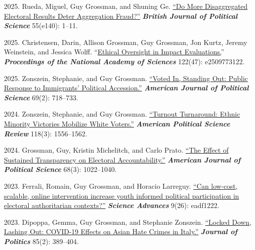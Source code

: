 \documentclass[10pt,a4paper]{article}
\begin{document}
\begin{etaremune}[leftmargin=2.5em, itemsep=8pt, topsep=4pt]
\item \textcolor{secondary}{2025.} Rueda, Miguel, Guy Grossman, and Shuning Ge. \href{https://www.cambridge.org/core/journals/british-journal-of-political-science/article/do-more-disaggregated-electoral-results-deter-aggregation-fraud/08AFBE74047115114DBA17E841DEFDDE}{``Do More Disaggregated Electoral Results Deter Aggregation Fraud?''} \textbf{\textit{British Journal of Political Science}} 55(e140): 1--11.

\item \textcolor{secondary}{2025.} Christensen, Darin, Allison Grossman, Guy Grossman, Jon Kurtz, Jeremy Weinstein, and Jessica Wolff. ``\href{https://www.pnas.org/doi/10.1073/pnas.2509773122}{Ethical Oversight in Impact Evaluations.}'' \textbf{\textit{Proceedings of the National Academy of Sciences}} 122(47): e2509773122.

\item \textcolor{secondary}{2025.} Zonszein, Stephanie, and Guy Grossman. \href{https://onlinelibrary.wiley.com/doi/10.1111/ajps.12877}{``Voted In, Standing Out: Public Response to Immigrants' Political Accession.''} \textbf{\textit{American Journal of Political Science}} 69(2): 718--733.

\item \textcolor{secondary}{2024.} Zonszein, Stephanie, and Guy Grossman. \href{https://doi.org/10.1017/S000305542300103X}{``Turnout Turnaround: Ethnic Minority Victories Mobilize White Voters.''} \textbf{\textit{American Political Science Review}} 118(3): 1556--1562.

\item \textcolor{secondary}{2024.} Grossman, Guy, Kristin Michelitch, and Carlo Prato. \href{http://dx.doi.org/10.1111/ajps.12787}{``The Effect of Sustained Transparency on Electoral Accountability.''} \textbf{\textit{American Journal of Political Science}} 68(3): 1022--1040.

\item \textcolor{secondary}{2023.} Ferrali, Romain, Guy Grossman, and Horacio Larreguy. \href{https://www.science.org/doi/10.1126/sciadv.adf1222}{``Can low-cost, scalable, online intervention increase youth informed political participation in electoral authoritarian contexts?''} \textbf{\textit{Science Advances}} 9(26): eadf1222.

\item \textcolor{secondary}{2023.} Dipoppa, Gemma, Guy Grossman, and Stephanie Zonszein. \href{https://www.journals.uchicago.edu/doi/abs/10.1086/722346}{``Locked Down, Lashing Out: COVID-19 Effects on Asian Hate Crimes in Italy.''} \textbf{\textit{Journal of Politics}} 85(2): 389--404.


\end{etaremune}
\end{document}
